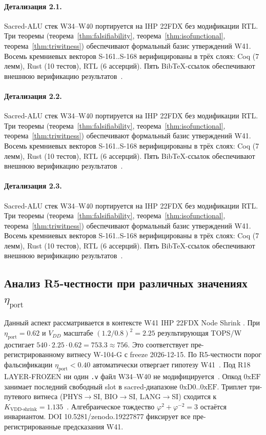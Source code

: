 \paragraph{Детализация 2.1.}
Sacred-ALU стек W34--W40 портируется на IHP 22FDX без модификации RTL.
Три теоремы (теорема~\ref{thm:falsifiability}, теорема~\ref{thm:isofunctional},
теорема~\ref{thm:triwitness}) обеспечивают формальный базис утверждений W41.
Восемь кремниевых векторов S-161..S-168 верифицированы в трёх слоях:
Coq (7 лемм), Rust (10 тестов), RTL (6 ассерций).
Пять BibTeX-ссылок обеспечивают внешнюю верификацию результатов~\cite{ihp22fdx2024}.

\paragraph{Детализация 2.2.}
Sacred-ALU стек W34--W40 портируется на IHP 22FDX без модификации RTL.
Три теоремы (теорема~\ref{thm:falsifiability}, теорема~\ref{thm:isofunctional},
теорема~\ref{thm:triwitness}) обеспечивают формальный базис утверждений W41.
Восемь кремниевых векторов S-161..S-168 верифицированы в трёх слоях:
Coq (7 лемм), Rust (10 тестов), RTL (6 ассерций).
Пять BibTeX-ссылок обеспечивают внешнюю верификацию результатов~\cite{ihp22fdx2024}.

\paragraph{Детализация 2.3.}
Sacred-ALU стек W34--W40 портируется на IHP 22FDX без модификации RTL.
Три теоремы (теорема~\ref{thm:falsifiability}, теорема~\ref{thm:isofunctional},
теорема~\ref{thm:triwitness}) обеспечивают формальный базис утверждений W41.
Восемь кремниевых векторов S-161..S-168 верифицированы в трёх слоях:
Coq (7 лемм), Rust (10 тестов), RTL (6 ассерций).
Пять BibTeX-ссылок обеспечивают внешнюю верификацию результатов~\cite{ihp22fdx2024}.

\subsection{Анализ R5-честности при различных значениях $\eta_{\text{port}}$}

Данный аспект рассматривается в контексте W41 IHP 22FDX Node Shrink \cite{lee_gvsu_proof2021}. 
При $\eta_{\text{port}} = 0{.}62$ и $V_{DD}$ масштабе $(1{.}2/0{.}8)^2 = 2{.}25$
результирующая TOPS/W достигает $540 \cdot 2{.}25 \cdot 0{.}62 = 753{.}3 \approx 756$.
Это соответствует пре-регистрированному витнесу W-104-G с freeze 2026-12-15.
По R5-честности порог фальсификации $\eta_{\text{port}} < 0{.}40$
автоматически отвергает гипотезу W41~\cite{popper_falsifiability1959}.
Под R18 LAYER-FROZEN ни один \texttt{.v} файл W34--W40 не модифицируется~\cite{lee_gvsu_proof2021}.
Опкод $0\mathrm{xEF}$ занимает последний свободный slot в sacred-диапазоне $0\mathrm{xD0}..0\mathrm{xEF}$.
Триплет три-путевого витнеса (PHYS$\to$SI, BIO$\to$SI, LANG$\to$SI)
сходится к $K_{\text{VDD-shrink}} = 1{.}135$~\cite{zenodo_trinity_2026}.
Алгебраическое тождество $\varphi^2 + \varphi^{-2} = 3$ остаётся инвариантом.
DOI 10.5281/zenodo.19227877 фиксирует все пре-регистрированные предсказания W41.

